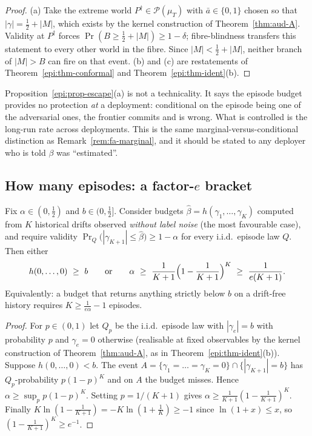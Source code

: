 \begin{proof}
(a) Take the extreme world $P^\dagger\in\mathcal P(\mu_T)$ with $\bar a\in\{0,1\}$ chosen so that
$|\gamma|=\tfrac12+|M|$, which exists by the kernel construction of Theorem~\ref{thm:aud-A}. Validity
at $P^\dagger$ forces $\Pr(B\ge\tfrac12+|M|)\ge1-\delta$; fibre-blindness transfers this statement to
every other world in the fibre. Since $|M|<\tfrac12+|M|$, neither branch of $|M|>B$ can fire on that
event. (b) and (c) are restatements of Theorem~\ref{epi:thm-conformal} and
Theorem~\ref{epi:thm-ident}(b).
\end{proof}

\begin{remark}\label{epi:rem-marginal}
Proposition~\ref{epi:prop-escape}(a) is not a technicality. It says the episode budget provides no
protection \emph{at} a deployment: conditional on the episode being one of the adversarial ones, the
frontier commits and is wrong. What is controlled is the long-run rate across deployments. This is
the same marginal-versus-conditional distinction as Remark~\ref{rem:fa-marginal}, and it should be
stated to any deployer who is told $\beta$ was ``estimated''.
\end{remark}

\subsection{How many episodes: a factor-$e$ bracket}

\begin{theorem}\label{epi:thm-floor}
Fix $\alpha\in(0,\tfrac12)$ and $b\in(0,\tfrac12]$. Consider budgets
$\widehat\beta=h(\gamma_1,\dots,\gamma_K)$ computed from $K$ historical drifts observed
\emph{without label noise} (the most favourable case), and require validity
$\Pr_{Q}\bigl(|\gamma_{K+1}|\le\widehat\beta\bigr)\ge1-\alpha$ for every i.i.d.\ episode law $Q$.
Then either
\[
h(0,\dots,0)\ \ge\ b
\qquad\text{or}\qquad
\alpha\ \ge\ \frac1{K+1}\Bigl(1-\frac1{K+1}\Bigr)^{K}\ \ge\ \frac1{e(K+1)} .
\]
Equivalently: a budget that returns anything strictly below $b$ on a drift-free history requires
$K\ge\tfrac1{e\alpha}-1$ episodes.
\end{theorem}

\begin{proof}
For $p\in(0,1)$ let $Q_p$ be the i.i.d.\ episode law with $|\gamma_e|=b$ with probability $p$ and
$\gamma_e=0$ otherwise (realisable at fixed observables by the kernel construction of
Theorem~\ref{thm:aud-A}, as in Theorem~\ref{epi:thm-ident}(b)). Suppose $h(0,\dots,0)<b$. The event
$A=\{\gamma_1=\dots=\gamma_K=0\}\cap\{|\gamma_{K+1}|=b\}$ has $Q_p$-probability $p(1-p)^K$ and on $A$
the budget misses. Hence $\alpha\ge\sup_{p}p(1-p)^K$. Setting $p=1/(K+1)$ gives
$\alpha\ge\frac1{K+1}(1-\frac1{K+1})^K$. Finally
$K\ln(1-\tfrac1{K+1})=-K\ln(1+\tfrac1K)\ge-1$ since $\ln(1+x)\le x$, so
$(1-\tfrac1{K+1})^K\ge e^{-1}$.
\end{proof}

